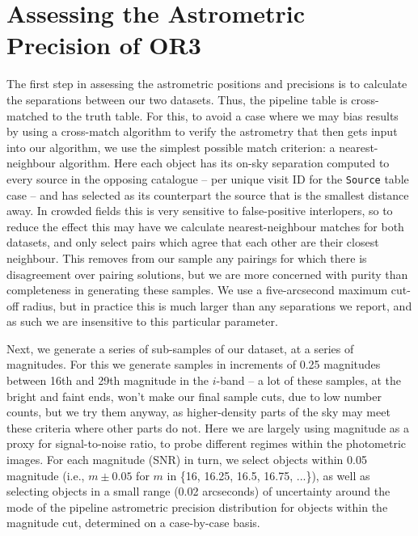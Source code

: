 \documentclass[SE,authoryear,toc]{lsstdoc}
\begin{document}
\section{Assessing the Astrometric Precision of OR3}
\label{sec:assessing_the_or3_precision}
The first step in assessing the astrometric positions and precisions is to calculate the separations between our two datasets.
Thus, the pipeline table is cross-matched to the truth table.
For this, to avoid a case where we may bias results by using a cross-match algorithm to verify the astrometry that then gets input into our algorithm, we use the simplest possible match criterion: a nearest-neighbour algorithm.
Here each object has its on-sky separation computed to every source in the opposing catalogue -- per unique visit ID for the \texttt{Source} table case -- and has selected as its counterpart the source that is the smallest distance away.
In crowded fields this is very sensitive to false-positive interlopers, so to reduce the effect this may have we calculate nearest-neighbour matches for both datasets, and only select pairs which agree that each other are their closest neighbour.
This removes from our sample any pairings for which there is disagreement over pairing solutions, but we are more concerned with purity than completeness in generating these samples.
We use a five-arcsecond maximum cut-off radius, but in practice this is much larger than any separations we report, and as such we are insensitive to this particular parameter.

Next, we generate a series of sub-samples of our dataset, at a series of magnitudes.
For this we generate samples in increments of 0.25 magnitudes between 16th and 29th magnitude in the $i$-band -- a lot of these samples, at the bright and faint ends, won't make our final sample cuts, due to low number counts, but we try them anyway, as higher-density parts of the sky may meet these criteria where other parts do not.
Here we are largely using magnitude as a proxy for signal-to-noise ratio, to probe different regimes within the photometric images.
For each magnitude (SNR) in turn, we select objects within 0.05 magnitude (i.e., $m\pm0.05$ for $m$ in \{16, 16.25, 16.5, 16.75, ...\}), as well as selecting objects in a small range (0.02 arcseconds) of uncertainty around the mode of the pipeline astrometric precision distribution for objects within the magnitude cut, determined on a case-by-case basis.
\end{document}
